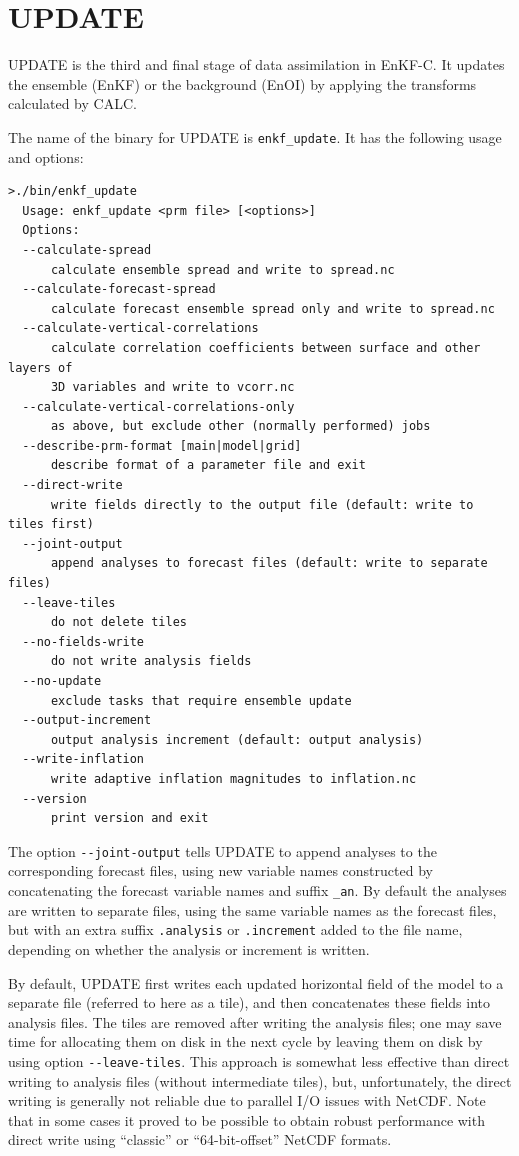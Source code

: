 \documentclass[11pt]{report}
\begin{document}
\section{UPDATE}

UPDATE is the third and final stage of data assimilation in EnKF-C.
It updates the ensemble (EnKF) or the background (EnOI) by applying the transforms calculated by CALC.

The name of the binary for UPDATE is \verb|enkf_update|.
It has the following usage and options:
\begin{Verbatim}[frame=single,fontsize=\footnotesize]
>./bin/enkf_update
  Usage: enkf_update <prm file> [<options>]
  Options:
  --calculate-spread
      calculate ensemble spread and write to spread.nc
  --calculate-forecast-spread
      calculate forecast ensemble spread only and write to spread.nc
  --calculate-vertical-correlations
      calculate correlation coefficients between surface and other layers of
      3D variables and write to vcorr.nc
  --calculate-vertical-correlations-only
      as above, but exclude other (normally performed) jobs
  --describe-prm-format [main|model|grid]
      describe format of a parameter file and exit
  --direct-write
      write fields directly to the output file (default: write to tiles first)
  --joint-output
      append analyses to forecast files (default: write to separate files)
  --leave-tiles
      do not delete tiles
  --no-fields-write
      do not write analysis fields
  --no-update
      exclude tasks that require ensemble update
  --output-increment
      output analysis increment (default: output analysis)
  --write-inflation
      write adaptive inflation magnitudes to inflation.nc
  --version
      print version and exit
\end{Verbatim}

The option \verb|--joint-output| tells UPDATE to append analyses to the corresponding forecast files, using new variable names constructed by concatenating the forecast variable names and suffix \verb|_an|.
By default the analyses are written to separate files, using the same variable names as the forecast files, but with an extra suffix \verb|.analysis| or \verb|.increment| added to the file name, depending on whether the analysis or increment is written.

By default, UPDATE first writes each updated horizontal field of the model to a separate file (referred to here as a tile), and then concatenates these fields into analysis files.
The tiles are removed after writing the analysis files; one may save time for allocating them on disk in the next cycle by leaving them on disk by using option \verb|--leave-tiles|.
This approach is somewhat less effective than direct writing to analysis files (without intermediate tiles), but, unfortunately, the direct writing is generally not reliable due to parallel I/O issues with NetCDF.
Note that in some cases it proved to be possible to obtain robust performance with direct write using ``classic'' or ``64-bit-offset'' NetCDF formats.
\end{document}
